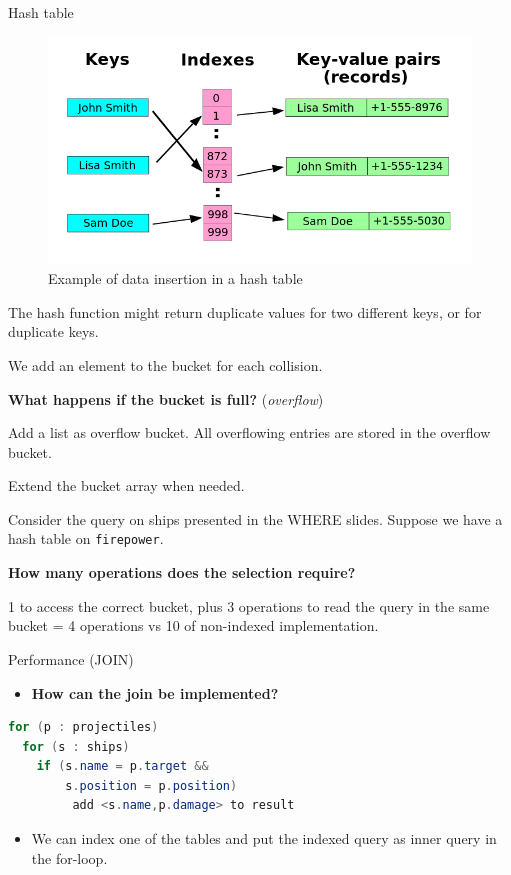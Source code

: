 \documentclass{beamer}
\begin{document}
\begin{frame}{Hash table}
\begin{figure}
\centering
\includegraphics[scale=0.25]{img/hash_table}
\caption{Example of data insertion in a hash table}
\end{figure}
\end{frame}

\begin{slide}{
\item The hash function might return duplicate values for two different keys, or for duplicate keys.
\item We add an element to the bucket for each collision.
\item \textbf{What happens if the bucket is full?} (\textit{overflow})
\pause
\item Add a list as overflow bucket. All overflowing entries are stored in the overflow bucket.
\item Extend the bucket array when needed.
}\end{slide}

\begin{slide}{
\item Consider the query on ships presented in the WHERE slides. Suppose we have a hash table on \texttt{firepower}.
\item \textbf{How many operations does the selection require?}
\pause
\item 1 to access the correct bucket, plus 3 operations to read the query in the same bucket = 4 operations vs 10 of non-indexed implementation.
}\end{slide}

\begin{frame}[fragile]{Performance (JOIN)}
\begin{itemize}
\item \textbf{How can the join be implemented?}
\pause
\end{itemize}
\begin{lstlisting}[language = Java]
for (p : projectiles)
  for (s : ships)
    if (s.name = p.target &&
        s.position = p.position)
         add <s.name,p.damage> to result
\end{lstlisting}
\begin{itemize}
\item We can index one of the tables and put the indexed query as inner query in the for-loop.
\end{itemize}
\end{frame}
\end{document}
